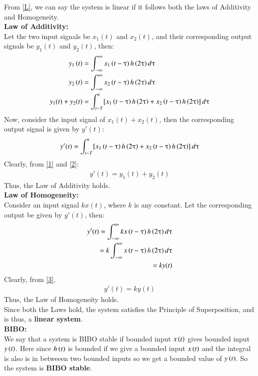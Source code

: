 \documentclass[journal,12pt,twocolumn]{IEEEtran}
\begin{document}
From \eqref{L}, we can say the system is linear if it follows both the laws of Additivity and Homogeneity.\\
\textbf{Law of Additivity:}\\
Let the two input signals be $x_1(t)$ and $x_2(t)$, and their corresponding output signals be $y_1(t)$ and $y_2(t)$, then:
\begin{align}
    y_{1}\left(t\right)&=\int_{-\infty}^{\infty}x_{1}\left(t-\uptau\right)h\left(2\uptau\right)d\uptau\\
    y_{2}\left(t\right)&=\int_{-\infty}^{\infty}x_{2}\left(t-\uptau\right)h\left(2\uptau\right)d\uptau \\
    y_1(t) + y_2(t) &= \int_{t-T}^t[x_{1}\left(t-\uptau\right)h\left(2\uptau\right) + x_{2}\left(t-\uptau\right)h\left(2\uptau\right)]\,d\uptau
    \label{1}
\end{align}
Now, consider the input signal of $x_1(t) + x_2(t)$, then the corresponding output signal is given by $y'(t)$:
\begin{align}
    y'(t) = \int_{t-T}^t[x_{1}\left(t-\uptau\right)h\left(2\uptau\right) + x_{2}\left(t-\uptau\right)h\left(2\uptau\right)]\,d\uptau
    \label{2}
\end{align}
Clearly, from \eqref{1} and \eqref{2}:
\begin{align}
    y'(t) = y_1(t) + y_2(t)
\end{align}
Thus, the Law of Additivity holds.\\
\textbf{Law of Homogeneity: }\\
Consider an input signal $kx(t)$, where $k$ is any constant. Let the corresponding output be given by $y'(t)$, then:
\begin{align}
    y'(t) = \int_{-\infty}^{\infty}kx\left(t-\uptau\right)h\left(2\uptau\right)d\uptau\\
    = k\int_{-\infty}^{\infty}x\left(t-\uptau\right)h\left(2\uptau\right)d\uptau\\
     = ky(t)
     \label{3}
\end{align}
Clearly, from \eqref{3},
\begin{align}
    y'(t) = ky(t)
\end{align}
Thus, the Law of Homogeneity holds.\\
Since both the Laws hold, the system satisfies the Principle of Superposition, and is thus, a \textbf{linear system}.\\



\textbf{BIBO:}\\
We say that a system is BIBO stable if bounded input $x \left(t\right)$ gives bounded input $y\left(t\right)$.
Here since $h\left(t\right)$ is bounded if we give a bounded input $x\left(t\right)$ and the integral is also is in betweeen two bounded inputs so we get a bounded value of $y\left(t\right)$.
So the system is \textbf{BIBO stable}.\\
\end{document}

